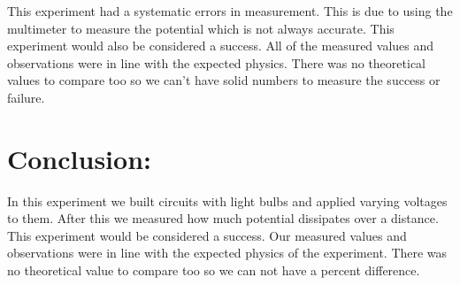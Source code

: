 \documentclass{article}
\begin{document}
This experiment had a systematic errors in measurement.  This is due to using the multimeter to measure the potential which is not always accurate. This experiment would also be considered a success.  All of the measured values and observations were in line with the expected physics.  There was no theoretical values to compare too so we can't have solid numbers to measure the success or failure.   

  
  


\singlespace
\newpage

\section*{Conclusion:}
In this experiment we built circuits with light bulbs and applied varying voltages to them.  After this we measured how much potential dissipates over a distance.  This experiment would be considered a success.  Our measured values and observations were in line with the expected physics of the experiment.  There was no theoretical value to compare too so we can not have a percent difference.
\end{document}

